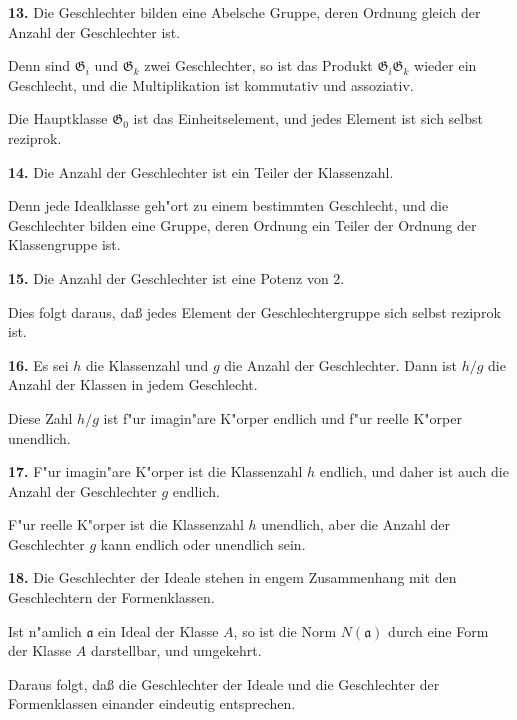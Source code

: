 \documentclass[11pt,a4paper]{article}
\theoremstyle{plain}
\begin{document}
\smallskip

\textbf{13.} Die Geschlechter bilden eine Abelsche Gruppe, deren Ordnung gleich der Anzahl der Geschlechter ist.

Denn sind $\mathfrak{G}_i$ und $\mathfrak{G}_k$ zwei Geschlechter, so ist das Produkt $\mathfrak{G}_i\mathfrak{G}_k$ wieder ein Geschlecht, und die Multiplikation ist kommutativ und assoziativ.

Die Hauptklasse $\mathfrak{G}_0$ ist das Einheitselement, und jedes Element ist sich selbst reziprok.

\smallskip

\textbf{14.} Die Anzahl der Geschlechter ist ein Teiler der Klassenzahl.

Denn jede Idealklasse geh"{o}rt zu einem bestimmten Geschlecht, und die Geschlechter bilden eine Gruppe, deren Ordnung ein Teiler der Ordnung der Klassengruppe ist.

\smallskip

\textbf{15.} Die Anzahl der Geschlechter ist eine Potenz von $2$.

Dies folgt daraus, da\ss{} jedes Element der Geschlechtergruppe sich selbst reziprok ist.

\newpage
\setcounter{page}{397}

\textbf{16.} Es sei $h$ die Klassenzahl und $g$ die Anzahl der Geschlechter. Dann ist $h/g$ die Anzahl der Klassen in jedem Geschlecht.

Diese Zahl $h/g$ ist f"{u}r imagin"{a}re K"{o}rper endlich und f"{u}r reelle K"{o}rper unendlich.

\smallskip

\textbf{17.} F"{u}r imagin"{a}re K"{o}rper ist die Klassenzahl $h$ endlich, und daher ist auch die Anzahl der Geschlechter $g$ endlich.

F"{u}r reelle K"{o}rper ist die Klassenzahl $h$ unendlich, aber die Anzahl der Geschlechter $g$ kann endlich oder unendlich sein.

\smallskip

\textbf{18.} Die Geschlechter der Ideale stehen in engem Zusammenhang mit den Geschlechtern der Formenklassen.

Ist n"{a}mlich $\mathfrak{a}$ ein Ideal der Klasse $A$, so ist die Norm $N(\mathfrak{a})$ durch eine Form der Klasse $A$ darstellbar, und umgekehrt.

Daraus folgt, da\ss{} die Geschlechter der Ideale und die Geschlechter der Formenklassen einander eindeutig entsprechen.

\smallskip
\end{document}
